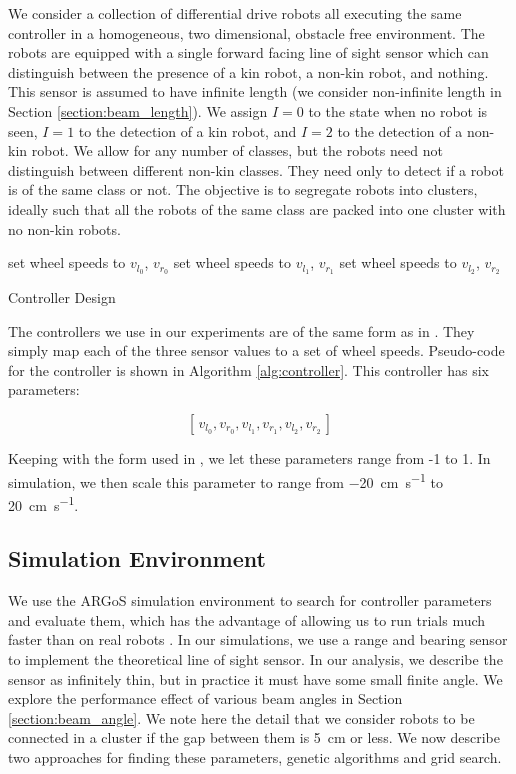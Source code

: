 \documentclass[conference]{IEEEtran}
\begin{document}
    We consider a collection of differential drive robots all executing the same controller in a homogeneous, two dimensional, obstacle free environment. The robots are equipped with a single forward facing line of sight sensor which can distinguish between the presence of a kin robot, a non-kin robot, and nothing. This sensor is assumed to have infinite length (we consider non-infinite length in Section \ref{section:beam_length}). We assign $I=0$ to the state when no robot is seen, $I=1$ to the detection of a kin robot, and $I=2$ to the detection of a non-kin robot. We allow for any number of classes, but the robots need not distinguish between different non-kin classes. They need only to detect if a robot is of the same class or not. The objective is to segregate robots into clusters, ideally such that all the robots of the same class are packed into one cluster with no non-kin robots.

    \begin{algorithm}[t!]
      \begin{algorithmic}
       \State set wheel speeds to $v_{l_0}$, $v_{r_0}$
       \State set wheel speeds to $v_{l_1}$, $v_{r_1}$
      \Else \State set wheel speeds to $v_{l_2}$, $v_{r_2}$
      \EndIf
      \end{algorithmic}
      \caption{Controller Design}
      \label{alg:controller}
    \end{algorithm}

    The controllers we use in our experiments are of the same form as in \cite{gauci_self-organized_2014}. They simply map each of the three sensor values to a set of wheel speeds. Pseudo-code for the controller is shown in Algorithm \ref{alg:controller}. This controller has six parameters:

    $$[\,v_{l_0}, v_{r_0}, v_{l_1}, v_{r_1}, v_{l_2}, v_{r_2}\,]$$

    Keeping with the form used in \cite{gauci_self-organized_2014}, we let these parameters range from -1 to 1. In simulation, we then scale this parameter to range from \SI{-20}{\centi\meter\per\second} to \SI{20}{\centi\meter\per\second}.

  \subsection{Simulation Environment}

    We use the ARGoS simulation environment to search for controller parameters and evaluate them, which has the advantage of allowing us to run trials much faster than on real robots \cite{pinciroli_argos:_2012}. In our simulations, we use a range and bearing sensor to implement the theoretical line of sight sensor. In our analysis, we describe the sensor as infinitely thin, but in practice it must have some small finite angle. We explore the performance effect of various beam angles in Section \ref{section:beam_angle}. We note here the detail that we consider robots to be connected in a cluster if the gap between them is \SI{5}{\centi\meter} or less. We now describe two approaches for finding these parameters, genetic algorithms and grid search.
\end{document}
